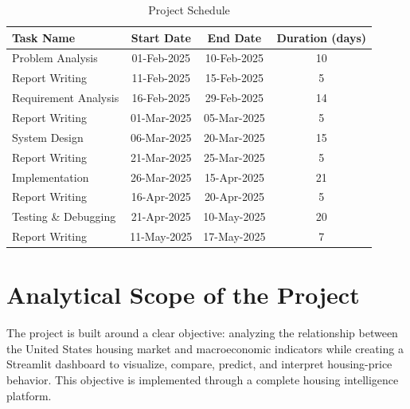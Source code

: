 \begin{table}[H]
\vspace*{\fill}
\centering
\Large
\renewcommand{\arraystretch}{2.0} %

\caption{Project Schedule}

\begin{tabular}{|p{6cm}|c|c|c|}
\hline
\textbf{Task Name} & \textbf{Start Date} & \textbf{End Date} & \textbf{Duration (days)} \\
\hline
Problem Analysis           & 01-Feb-2025 & 10-Feb-2025 & 10 \\
Report Writing             & 11-Feb-2025 & 15-Feb-2025 & 5  \\
Requirement Analysis       & 16-Feb-2025 & 29-Feb-2025 & 14 \\
Report Writing             & 01-Mar-2025 & 05-Mar-2025 & 5  \\
System Design              & 06-Mar-2025 & 20-Mar-2025 & 15 \\
Report Writing             & 21-Mar-2025 & 25-Mar-2025 & 5  \\
Implementation             & 26-Mar-2025 & 15-Apr-2025 & 21 \\
Report Writing             & 16-Apr-2025 & 20-Apr-2025 & 5  \\
Testing \& Debugging       & 21-Apr-2025 & 10-May-2025 & 20 \\
Report Writing             & 11-May-2025 & 17-May-2025 & 7  \\
\hline
\end{tabular}

\vspace*{\fill}
\end{table}



\section{Analytical Scope of the Project}

The project is built around a clear objective: analyzing the relationship between the United States housing market and macroeconomic indicators while creating a Streamlit dashboard to visualize, compare, predict, and interpret housing-price behavior. This objective is implemented through a complete housing intelligence platform.

